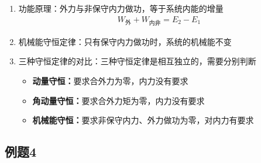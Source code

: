 \begin{enumerate}
\begin{itemize}
	\end{itemize}
	
	
	\item 功能原理：外力与非保守内力做功，等于系统内能的增量
	\begin{align*}
		W_{\text{外}} + W_{\text{内非}} = E_2 - E_1
	\end{align*}
	
	\item 机械能守恒定律：只有保守内力做功时，系统的机械能不变
	
	\item 三种守恒定律的对比：三种守恒定律是相互独立的，需要分别判断
	\begin{itemize}
		\item \textbf{动量守恒：}要求合外力为零，内力没有要求
		\item \textbf{角动量守恒：}要求合外力矩为零，内力没有要求
		\item \textbf{机械能守恒：}要求非保守内力、外力做功为零，对内力有要求
	\end{itemize}
	


\end{enumerate}


\newpage
\subsection{例题4}


